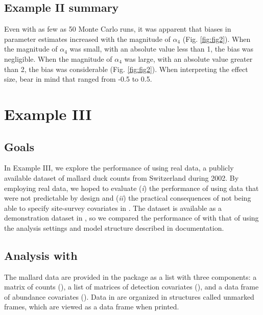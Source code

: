 \documentclass[codesnippet]{jss}
\begin{document}
\subsection[Example II summary]{Example II summary}
Even with as few as 50 Monte Carlo runs, it was apparent that biases in parameter estimates increased with the magnitude of $\alpha_4$ (Fig. \ref{fig:fig2}). When the magnitude of $\alpha_4$ was small, with an absolute value less than 1, the bias was negligible. When the magnitude of $\alpha_4$ was large, with an absolute value greater than 2, the bias was considerable (Fig. \ref{fig:fig2}). When interpreting the effect size, bear in mind that  ranged from -0.5 to 0.5.

\section[Example III]{Example III}
\subsection[Goals]{Goals}
In Example III, we explore the performance of  using real data, 
a publicly available dataset of mallard duck counts from Switzerland during 
2002. By employing real data, we hoped to evaluate (\textit{i}) the 
performance of  using data that were not predictable by design 
and (\textit{ii}) the practical consequences of not being able to specify 
site-survey covariates in . The dataset is available as a 
demonstration dataset in , so we compared the performance of 
 with that of  using the analysis settings and 
model structure described in  documentation.

\subsection[Analysis with R-INLA]{Analysis with }
The mallard data are provided in the  package as a list with 
three components: a matrix of counts (), a list of matrices 
of detection covariates (), and a data frame of abundance 
covariates (). Data in  are organized in 
structures called unmarked frames, which are viewed as a data frame when 
printed.
\end{document}
